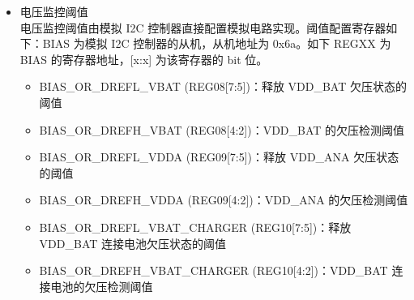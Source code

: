 \documentclass[main\_\_CN.tex]{subfiles}
\begin{document}
\begin{itemize}
    \item 电压监控阈值\\
    电压监控阈值由模拟 I2C 控制器直接配置模拟电路实现。阈值配置寄存器如下：BIAS 为模拟 I2C 控制器的从机，从机地址为 0x6a。如下 REGXX 为 BIAS 的寄存器地址，[x:x] 为该寄存器的 bit 位。\\
        \begin{itemize}
        \item BIAS\_OR\_DREFL\_VBAT (REG08[7:5])：释放 VDD\_BAT 欠压状态的阈值\\
        \item BIAS\_OR\_DREFH\_VBAT (REG08[4:2])：VDD\_BAT 的欠压检测阈值\\
        \item BIAS\_OR\_DREFL\_VDDA (REG09[7:5])：释放 VDD\_ANA 欠压状态的阈值\\
        \item BIAS\_OR\_DREFH\_VDDA (REG09[4:2])：VDD\_ANA 的欠压检测阈值\\
        \item BIAS\_OR\_DREFL\_VBAT\_CHARGER (REG10[7:5])：释放 VDD\_BAT 连接电池欠压状态的阈值\\
        \item BIAS\_OR\_DREFH\_VBAT\_CHARGER (REG10[4:2])：VDD\_BAT 连接电池的欠压检测阈值\\
        \end{itemize}



\end{itemize}
\end{document}
